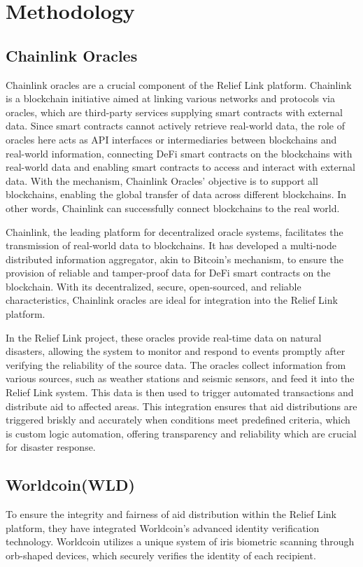 \documentclass[conference]{IEEEtran}
\begin{document}
\section{Methodology}
\subsection{Chainlink Oracles}
Chainlink oracles are a crucial component of the Relief Link platform. Chainlink is a blockchain initiative aimed at linking various networks and protocols via oracles, which are third-party services supplying smart contracts with external data. Since smart contracts cannot actively retrieve real-world data, the role of oracles here acts as API interfaces or intermediaries between blockchains and real-world information, connecting DeFi smart contracts on the blockchains with real-world data and enabling smart contracts to access and interact with external data. With the mechanism, Chainlink Oracles' objective is to support all blockchains, enabling the global transfer of data across different blockchains. In other words, Chainlink can successfully connect blockchains to the real world.

Chainlink, the leading platform for decentralized oracle systems, facilitates the transmission of real-world data to blockchains. It has developed a multi-node distributed information aggregator, akin to Bitcoin's mechanism, to ensure the provision of reliable and tamper-proof data for DeFi smart contracts on the blockchain. With its decentralized, secure, open-sourced, and reliable characteristics, Chainlink oracles are ideal for integration into the Relief Link platform.

In the Relief Link project, these oracles provide real-time data on natural disasters, allowing the system to monitor and respond to events promptly after verifying the reliability of the source data. The oracles collect information from various sources, such as weather stations and seismic sensors, and feed it into the Relief Link system. This data is then used to trigger automated transactions and distribute aid to affected areas. This integration ensures that aid distributions are triggered briskly and accurately when conditions meet predefined criteria, which is custom logic automation, offering transparency and reliability which are crucial for disaster response.

\subsection{Worldcoin(WLD)}
To ensure the integrity and fairness of aid distribution within the Relief Link platform, they have integrated Worldcoin's advanced identity verification technology. Worldcoin utilizes a unique system of iris biometric scanning through orb-shaped devices, which securely verifies the identity of each recipient.
\end{document}
